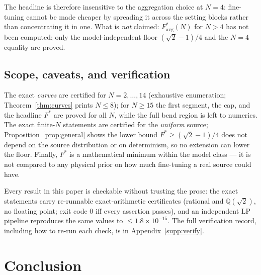 \documentclass[aps,pra,reprint,superscriptaddress,floatfix]{revtex4-2}
\begin{document}
\noindent
The headline is therefore insensitive to the aggregation choice at $N=4$:
fine-tuning cannot be made cheaper by spreading it across the setting
blocks rather than concentrating it in one. What is \emph{not} claimed:
$F^*_{\mathrm{avg}}(N)$ for $N>4$ has not been computed; only the
model-independent floor $(\sqrt2-1)/4$ and the $N=4$ equality are proved.

\subsection{Scope, caveats, and verification}
The exact \emph{curves} are certified for $N=2,\dots,14$ (exhaustive
enumeration; Theorem~\ref{thm:curves} prints $N\le8$); for $N\ge15$ the first
segment, the cap, and the headline $F^*$ are proved for all $N$, while the
full bend region is left to numerics. The
exact finite-$N$ statements are certified for the \emph{uniform} source;
Proposition~\ref{prop:general} shows the lower bound
$F^*\ge(\sqrt2-1)/4$ does not depend on the source distribution or on
determinism, so no extension can lower the floor. Finally, $F^*$ is a
mathematical minimum within the model class --- it is not compared to any
physical prior on how much fine-tuning a real source could have.

Every result in this paper is checkable without trusting the prose: the exact
statements carry re-runnable exact-arithmetic certificates (rational and
$\mathbb{Q}(\sqrt2)$, no floating point; exit code $0$ iff every assertion
passes), and an independent LP pipeline reproduces the same values to
$\le1.8\times10^{-15}$. The full verification record, including how to re-run
each check, is in Appendix~\ref{supp:verify}.

\section{Conclusion}
\label{sec:conclusion}
\end{document}
